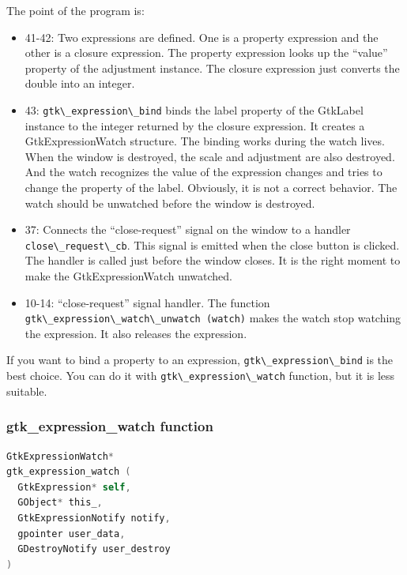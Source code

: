 The point of the program is:

\begin{itemize}
\tightlist
\item
  41-42: Two expressions are defined. One is a property expression and
  the other is a closure expression. The property expression looks up
  the ``value'' property of the adjustment instance. The closure
  expression just converts the double into an integer.
\item
  43: \passthrough{\lstinline!gtk\_expression\_bind!} binds the label
  property of the GtkLabel instance to the integer returned by the
  closure expression. It creates a GtkExpressionWatch structure. The
  binding works during the watch lives. When the window is destroyed,
  the scale and adjustment are also destroyed. And the watch recognizes
  the value of the expression changes and tries to change the property
  of the label. Obviously, it is not a correct behavior. The watch
  should be unwatched before the window is destroyed.
\item
  37: Connects the ``close-request'' signal on the window to a handler
  \passthrough{\lstinline!close\_request\_cb!}. This signal is emitted
  when the close button is clicked. The handler is called just before
  the window closes. It is the right moment to make the
  GtkExpressionWatch unwatched.
\item
  10-14: ``close-request'' signal handler. The function
  \passthrough{\lstinline!gtk\_expression\_watch\_unwatch (watch)!}
  makes the watch stop watching the expression. It also releases the
  expression.
\end{itemize}

If you want to bind a property to an expression,
\passthrough{\lstinline!gtk\_expression\_bind!} is the best choice. You
can do it with \passthrough{\lstinline!gtk\_expression\_watch!}
function, but it is less suitable.

\subsubsection{gtk\_expression\_watch
function}\label{gtk_expression_watch-function}

\begin{lstlisting}[language=C]
GtkExpressionWatch*
gtk_expression_watch (
  GtkExpression* self,
  GObject* this_,
  GtkExpressionNotify notify,
  gpointer user_data,
  GDestroyNotify user_destroy
)
\end{lstlisting}

